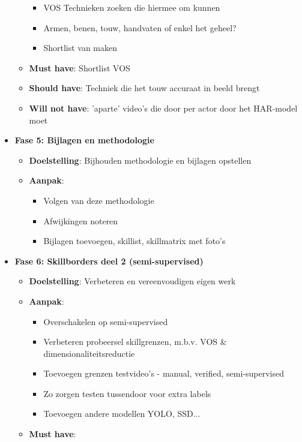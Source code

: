 \begin{itemize}
\begin{itemize}
\begin{itemize}
            \item VOS Technieken zoeken die hiermee om kunnen
            \item Armen, benen, touw, handvaten of enkel het geheel?
            \item Shortlist van maken
        \end{itemize}
        \item \textbf{Must have}: Shortlist VOS
        \item \textbf{Should have}: Techniek die het touw accuraat in beeld brengt
        \item \textbf{Will not have}: 'aparte' video's die door per actor door het HAR-model moet
    \end{itemize}
    \item \textbf{Fase 5: Bijlagen en methodologie}
    \begin{itemize}
        \item \textbf{Doelstelling}: Bijhouden methodologie en bijlagen opstellen
        \item \textbf{Aanpak}:
        \begin{itemize}
            \item Volgen van deze methodologie
            \item Afwijkingen noteren
            \item Bijlagen toevoegen, skillist, skillmatrix met foto's
        \end{itemize}
    \end{itemize}
    \item \textbf{Fase 6: Skillborders deel 2 (semi-supervised)}
    \begin{itemize}
        \item \textbf{Doelstelling}: Verbeteren en vereenvoudigen eigen werk
        \item \textbf{Aanpak}:
        \begin{itemize}
            \item Overschakelen op semi-supervised
            \item Verbeteren probeersel skillgrenzen, m.b.v. VOS \& dimensionaliteitsreductie
            \item Toevoegen grenzen testvideo's - manual, verified, semi-supervised
            \item Zo zorgen testen tussendoor voor extra labels
            \item Toevoegen andere modellen YOLO, SSD...
        \end{itemize}
        \item \textbf{Must have}:

\end{itemize}
\end{itemize}
